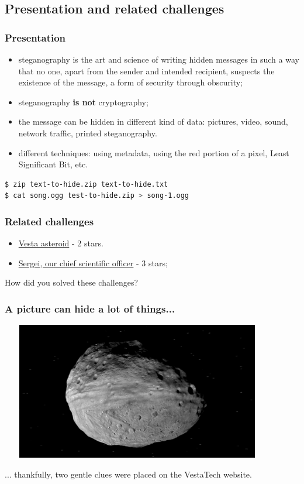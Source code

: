 \documentclass[]{beamer}
\begin{document}
\subsection{Presentation and related challenges}
\begin{frame}[fragile]
\frametitle{Presentation}
\begin{itemize}
    \item steganography is the art and science of writing hidden messages in such a way that no one, apart from the sender and intended recipient, suspects the existence of the message, a form of security through obscurity;
    \item steganography \textbf{is not} cryptography;
    \item the message can be hidden in different kind of data: pictures, video, sound, network traffic, printed steganography.
    \item different techniques: using metadata, using the red portion of a pixel, Least Significant Bit, etc.
\end{itemize}
\begin{lstlisting}[language=Bash]
$ zip text-to-hide.zip text-to-hide.txt
$ cat song.ogg test-to-hide.zip > song-1.ogg
\end{lstlisting}
\end{frame}

\begin{frame}
\frametitle{Related challenges}
\begin{itemize}
    \item \href{https://github.com/cscluxembourg/vestatech/blob/master/challenges/Vesta-asteroid/vesta.png}{Vesta asteroid} - 2 stars.
    \item \href{https://github.com/cscluxembourg/vestatech/blob/master/challenges/sergei/Sergei.png}{Sergei, our chief scientific officer} - 3 stars;
\end{itemize}
\bigskip
How did you solved these challenges?
\end{frame}

\begin{frame}
\frametitle{A picture can hide a lot of things...}
\begin{center}
    \includegraphics[height=6.0cm, width=12.0cm]{./images/vesta.png}
\end{center}
... thankfully, two gentle clues were placed on the VestaTech website.
\end{frame}
\end{document}
